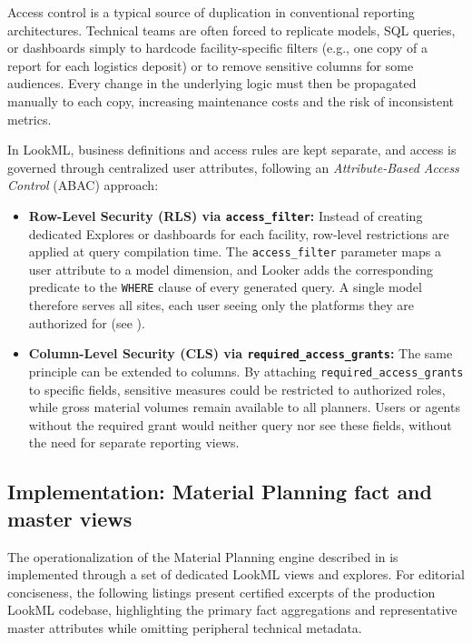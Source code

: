 Access control is a typical source of duplication in conventional reporting architectures.
Technical teams are often forced to replicate models, SQL queries, or dashboards simply to hardcode facility-specific filters
(e.g., one copy of a report for each logistics deposit) or to remove sensitive columns for some audiences.
Every change in the underlying logic must then be propagated manually to each copy, increasing maintenance costs and the risk of inconsistent metrics.

In LookML, business definitions and access rules are kept separate, and access is governed through centralized user attributes,
following an \textit{Attribute-Based Access Control} (ABAC) approach:
\begin{itemize}
    \item \textbf{Row-Level Security (RLS) via \texttt{access\_filter}:} Instead of creating dedicated Explores or dashboards for each facility,
    row-level restrictions are applied at query compilation time. The \texttt{access\_filter} parameter maps a user attribute to a model dimension,
    and Looker adds the corresponding predicate to the \texttt{WHERE} clause of every generated query.
    A single model therefore serves all sites, each user seeing only the platforms they are authorized for (see ).
    \item \textbf{Column-Level Security (CLS) via \texttt{required\_access\_grants}:} The same principle can be extended to columns.
    By attaching \texttt{required\_access\_grants} to specific fields, sensitive measures could be
    restricted to authorized roles, while gross material volumes remain available to all planners.
    Users or agents without the required grant would neither query nor see these fields, without the need for separate reporting views.
\end{itemize}

\subsection{Implementation: Material Planning fact and master views}
The operationalization of the Material Planning engine described in  is implemented through a set of dedicated LookML views and explores. For editorial conciseness, the following listings present certified excerpts of the production LookML codebase, highlighting the primary fact aggregations and representative master attributes while omitting peripheral technical metadata.

